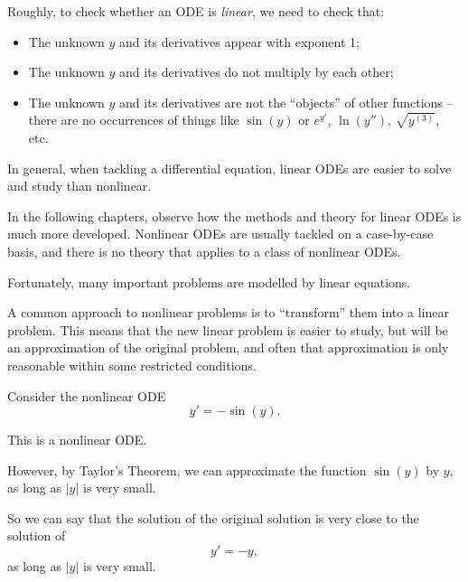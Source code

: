 \begin{graybox}
	Roughly, to check whether an ODE is \emph{linear}, we need to check that:
	\begin{itemize}
		\item The unknown $y$ and its derivatives appear with exponent 1;
		\item The unknown $y$ and its derivatives do not multiply by each other;
		\item The unknown $y$ and its derivatives are not the ``objects'' of other functions -- there are no occurrences of things like $\sin(y)$ or $e^{y'}$, $\ln(y'')$, $\sqrt{y^{(3)}}$, etc.
	\end{itemize}
\end{graybox}

In general, when tackling a differential equation, linear ODEs are easier to solve and study than nonlinear. 

In the following chapters, observe how the methods and theory for linear ODEs is much more developed. Nonlinear ODEs are usually tackled on a case-by-case basis, and there is no theory that applies to a class of nonlinear ODEs.

Fortunately, many important problems are modelled by linear equations.

A common approach to nonlinear problems is to ``transform'' them into a linear problem. This means that the new linear problem is easier to study, but will be an approximation of the original problem, and often that approximation is only reasonable within some restricted conditions.

\begin{example}
Consider the nonlinear ODE
$$y' = -\sin(y).$$

This is a nonlinear ODE. 

However, by Taylor's Theorem, we can approximate the function $\sin(y)$ by $y$, as long as $|y|$ is very small.

So we can say that the solution of the original solution is very close to the solution of
$$ y' = -y,$$
as long as $|y|$ is very small.
\end{example}



